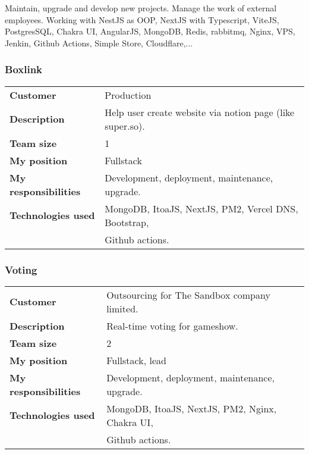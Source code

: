 \documentclass[10pt]{article} %
\begin{document}
Maintain, upgrade and develop new projects. Manage the work of external employees. Working with NestJS as OOP, NextJS with Typescript, ViteJS, PostgresSQL, Chakra UI, AngularJS, MongoDB, Redis, rabbitmq, Nginx, VPS, Jenkin, Github Actions, Simple Store, Cloudflare,...

\subsubsection*{Boxlink}
\begin{tabular}{ll}
  \textbf{Customer} & Production \\
  \textbf{Description} & Help user create website via notion page (like super.so). \\
  \textbf{Team size} & 1 \\
  \textbf{My position} & Fullstack \\
  \textbf{My responsibilities} & Development, deployment, maintenance, upgrade. \\
  \textbf{Technologies used} & MongoDB, ItoaJS, NextJS, PM2, Vercel DNS, Bootstrap, \\
                             & Github actions. \\
\end{tabular}

\subsubsection*{Voting}
\begin{tabular}{ll}
  \textbf{Customer} & Outsourcing for The Sandbox company limited. \\
  \textbf{Description} & Real-time voting for gameshow. \\
  \textbf{Team size} & 2 \\
  \textbf{My position} & Fullstack, lead \\
  \textbf{My responsibilities} & Development, deployment, maintenance, upgrade. \\
  \textbf{Technologies used} & MongoDB, ItoaJS, NextJS, PM2, Nginx, Chakra UI, \\ 
                             & Github actions. \\
\end{tabular}
\end{document}
